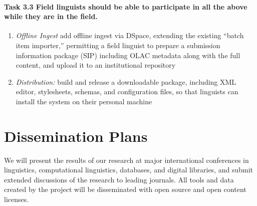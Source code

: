 \def\task{3.3}
\paragraph{Task {\task} Field linguists should be able to participate in all the
    above while they are in the field.}

\begin{enumerate}[label=\emph{\task\alph*}]
\item \emph{Offline Ingest}
  add offline ingest via DSpace, extending the existing ``batch
  item importer,'' permitting a field linguist to
  prepare a submission information package (SIP) including OLAC
  metadata along with the full content, and upload it to an institutional repository
\item \emph{Distribution:}
  build and release a downloadable package, including XML editor,
  stylesheets, schemas, and configuration files, so that linguists
  can install the system on their personal machine
\end{enumerate}

\section{Dissemination Plans}
\label{sec:dissemination}

We will present the results of our research at major international
conferences in linguistics, computational linguistics, databases, and
digital libraries, and submit extended discussions of the research to
leading journals.  All tools and data created by the project will be
disseminated with open source and open content licenses.

